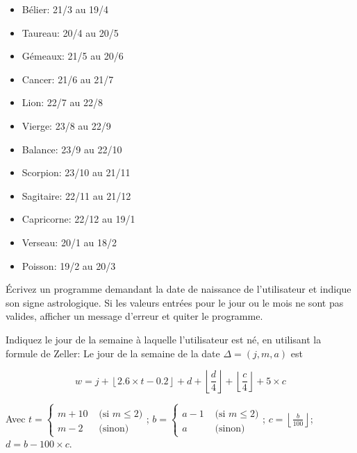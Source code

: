 \documentclass[10pt]{article}\usepackage[correction]{esial}
\begin{document}
\begin{minipage}{.3\linewidth}
  \begin{itemize}
  \item Bélier: 21/3 au 19/4
  \item Taureau: 20/4 au 20/5
  \item Gémeaux: 21/5 au 20/6
  \item Cancer: 21/6 au 21/7
  \end{itemize}
\end{minipage}\hfill\begin{minipage}{.3\linewidth}
  \begin{itemize}
  \item Lion: 22/7 au 22/8
  \item Vierge: 23/8 au 22/9
  \item Balance: 23/9 au 22/10
  \item Scorpion: 23/10 au 21/11
  \end{itemize}
\end{minipage}\hfill\begin{minipage}{.3\linewidth}
  \begin{itemize}
  \item Sagitaire: 22/11 au 21/12
  \item Capricorne: 22/12 au 19/1
  \item Verseau: 20/1 au 18/2
  \item Poisson: 19/2 au 20/3
  \end{itemize}
\end{minipage}

\Question Écrivez un programme demandant la date de naissance de l'utilisateur
et indique son signe astrologique. Si les valeurs entrées pour le jour ou le
mois ne sont pas valides, afficher un message d'erreur et quiter le programme.

\Question Indiquez le jour de la semaine à laquelle l'utilisateur est né, en
utilisant la formule de Zeller: Le jour de la semaine de la date
$\Delta=(j,m,a)$ est 

$$w=j+\left\lfloor 2.6\times t - 0.2 \right\rfloor + d + 
 \left\lfloor \frac{d}{4} \right\rfloor + 
 \left\lfloor \frac{c}{4} \right\rfloor + 5\times c
$$

Avec $\displaystyle t=\left\{\begin{array}{ll}\\
    m+10&\mbox{ (si } m\leq 2)\\
    m-2&\mbox{ (sinon)}
  \end{array}\right.$;  
  $\displaystyle
  b=\left\{\begin{array}{ll}\\
    a-1&\textrm{ (si } m\leq 2)\\
    a&\textrm{ (sinon)}
  \end{array}\right.$; 
  $\displaystyle
  c=\left\lfloor\frac{b}{100}\right\rfloor$;
  $\displaystyle
  d=b-100\times c$.
  
\end{document}
